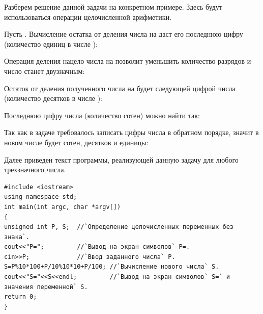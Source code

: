 
Разберем решение данной задачи на конкретном примере. Здесь будут использоваться операции целочисленной арифметики. 

Пусть . Вычисление остатка от деления числа  на  даст
его последнюю цифру (количество единиц в числе ):

Операция деления нацело числа  на  позволит уменьшить количество разрядов и
число станет двузначным:


Остаток от деления полученного числа на  будет следующей цифрой числа 
(количество десятков в числе ):


Последнюю цифру числа  (количество сотен) можно найти так:


Так как в задаче требовалось записать цифры числа  в обратном порядке, значит в новом числе будет
 сотен,  десятков и  единицы:


Далее приведен текст программы, реализующей данную задачу для любого трехзначного числа.

\begin{lstlisting}
#include <iostream>
using namespace std;
int main(int argc, char *argv[])
{
unsigned int P, S;  //`Определение целочисленных переменных без знака`.
cout<<"P=";         //`Вывод на экран символов` P=.
cin>>P;             //`Ввод заданного числа` P.
S=P%10*100+P/10%10*10+P/100; //`Вычисление нового числа` S.
cout<<"S="<<S<<endl;         //`Вывод на экран символов` S=` и значения переменной` S.
return 0;
}
\end{lstlisting}


